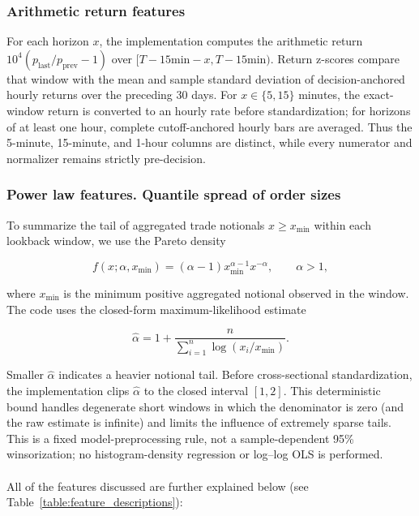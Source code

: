 \documentclass{ieeeaccess}
\begin{document}
\subsubsection{Arithmetic return features}

For each horizon $x$, the implementation computes the arithmetic return $10^4(p_{\mathrm{last}}/p_{\mathrm{prev}}-1)$ over $[T-15\text{min}-x,T-15\text{min})$. Return z-scores compare that window with the mean and sample standard deviation of decision-anchored hourly returns over the preceding 30 days. For $x\in\{5,15\}$ minutes, the exact-window return is converted to an hourly rate before standardization; for horizons of at least one hour, complete cutoff-anchored hourly bars are averaged. Thus the 5-minute, 15-minute, and 1-hour columns are distinct, while every numerator and normalizer remains strictly pre-decision.

\subsubsection{Power law features. Quantile spread of order sizes}

To summarize the tail of aggregated trade notionals $x\geq x_{\min}$ within each lookback window, we use the Pareto density

\begin{equation}
    f(x;\alpha,x_{\min})=(\alpha-1)x_{\min}^{\alpha-1}x^{-\alpha}, \qquad \alpha>1,
    \label{eq:powerlaw_pdf}
\end{equation}

where $x_{\min}$ is the minimum positive aggregated notional observed in the window. The code uses the closed-form maximum-likelihood estimate

\begin{equation}
    \hat{\alpha}=1+\frac{n}{\sum_{i=1}^{n}\log(x_i/x_{\min})}.
    \label{eq:powerlaw_ols}
\end{equation}

Smaller $\hat{\alpha}$ indicates a heavier notional tail. Before cross-sectional standardization, the implementation clips $\hat{\alpha}$ to the closed interval $[1,2]$. This deterministic bound handles degenerate short windows in which the denominator is zero (and the raw estimate is infinite) and limits the influence of extremely sparse tails. This is a fixed model-preprocessing rule, not a sample-dependent 95\% winsorization; no histogram-density regression or log--log OLS is performed.
\\ \\
All of the features discussed are further explained below (see Table~\ref{table:feature_descriptions}):
\end{document}
